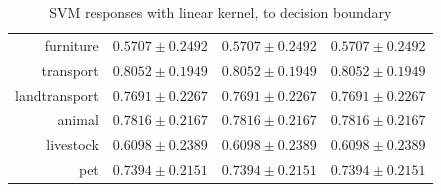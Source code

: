 \documentclass[11pt,a4paper]{article}
\begin{document}
\begin{table}[htbp]
\begin{tabular}{r|c|c|c}
furniture     & $0.5707\pm0.2492$ & $0.5707\pm0.2492$ & $0.5707\pm0.2492$\\
transport     & $0.8052\pm0.1949$ & $0.8052\pm0.1949$ & $0.8052\pm0.1949$\\
landtransport & $0.7691\pm0.2267$ & $0.7691\pm0.2267$ & $0.7691\pm0.2267$\\
animal        & $0.7816\pm0.2167$ & $0.7816\pm0.2167$ & $0.7816\pm0.2167$\\
livestock     & $0.6098\pm0.2389$ & $0.6098\pm0.2389$ & $0.6098\pm0.2389$\\
pet           & $0.7394\pm0.2151$ & $0.7394\pm0.2151$ & $0.7394\pm0.2151$
\end{tabular}
\caption{SVM responses with linear kernel, to decision boundary}
\label{tab:svmresp}
\end{table}
\end{document}
